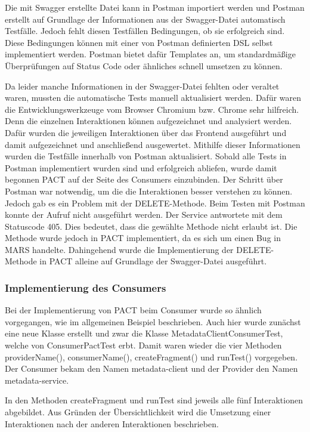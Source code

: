 \documentclass{llncs}
\begin{document}
Die mit Swagger erstellte Datei kann in Postman importiert werden und Postman erstellt auf Grundlage der Informationen aus der Swagger-Datei automatisch Testfälle. Jedoch fehlt diesen Testfällen Bedingungen, ob sie erfolgreich sind. Diese Bedingungen können mit einer von Postman definierten DSL selbst implementiert werden. Postman bietet dafür Templates an, um standardmäßige Überprüfungen auf Status Code oder ähnliches schnell umsetzen zu können.

Da leider manche Informationen in der Swagger-Datei fehlten oder veraltet waren, mussten die automatische Tests manuell aktualisiert werden. Dafür waren die Entwicklungswerkzeuge vom Browser Chromium bzw. Chrome sehr hilfreich. Denn die einzelnen Interaktionen können aufgezeichnet und analysiert werden. Dafür wurden die jeweiligen Interaktionen über das Frontend ausgeführt und damit aufgezeichnet und anschließend ausgewertet. Mithilfe dieser Informationen wurden die Testfälle innerhalb von Postman aktualisiert. Sobald alle Tests in Postman implementiert wurden sind und erfolgreich abliefen, wurde damit begonnen PACT auf der Seite des Consumers einzubinden. Der Schritt über Postman war notwendig, um die die Interaktionen besser verstehen zu können. Jedoch gab es ein Problem mit der DELETE-Methode. Beim Testen mit Postman konnte der Aufruf nicht ausgeführt werden. Der Service antwortete mit dem Statuscode 405. Dies bedeutet, dass die gewählte Methode nicht erlaubt ist. Die Methode wurde jedoch in PACT implementiert, da es sich um einen Bug in MARS handelte. Dahingehend wurde die Implementierung der DELETE-Methode in PACT alleine auf Grundlage der Swagger-Datei ausgeführt.

\subsubsection{Implementierung des Consumers}
Bei der Implementierung von PACT beim Consumer wurde so ähnlich vorgegangen, wie im allgemeinen Beispiel beschrieben. Auch hier wurde zunächst eine neue Klasse erstellt und zwar die Klasse MetadataClientConsumerTest, welche von ConsumerPactTest erbt. Damit waren wieder die vier Methoden providerName(), consumerName(), createFragment() und runTest() vorgegeben. Der Consumer bekam den Namen metadata-client und der Provider den Namen metadata-service. 

In den Methoden createFragment und runTest sind jeweils alle fünf Interaktionen abgebildet. Aus Gründen der Übersichtlichkeit wird die Umsetzung einer Interaktionen nach der anderen Interaktionen beschrieben.
\end{document}
